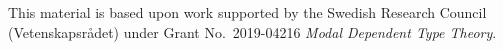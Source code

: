 \documentclass[acmsmall,review,anonymous]{acmart}\settopmatter{printfolios=true,printccs=false,printacmref=false}
\theoremstyle{remark}
\begin{document}
\begin{acks}                            %

  This material is based upon work supported by the
  Swedish Research Council (Vetenskapsrådet)
  under Grant
  No.~2019-04216 \emph{Modal Dependent Type Theory}.

\end{acks}






\end{document}
